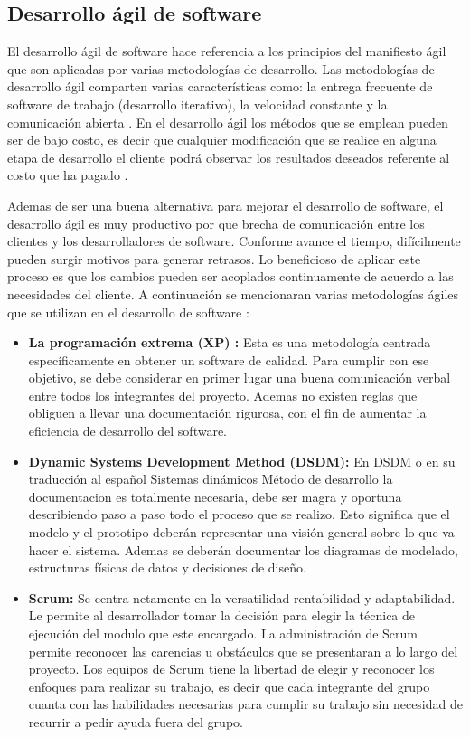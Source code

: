 \subsection{Desarrollo ágil de software}

El desarrollo ágil de software hace referencia a los principios del manifiesto ágil que son aplicadas por varias metodologías de desarrollo. Las metodologías de desarrollo ágil comparten varias características como: la entrega frecuente de software de trabajo (desarrollo iterativo), la velocidad constante y la comunicación abierta \cite{Whiting2022}. En el desarrollo ágil los métodos que se emplean pueden ser de bajo costo, es decir que cualquier modificación que se realice en alguna etapa de desarrollo el cliente podrá observar los resultados deseados referente al costo que ha pagado \cite{Shafiq2018}. 

Ademas de ser una buena alternativa para mejorar el desarrollo de software, el desarrollo ágil es muy productivo por que brecha de comunicación entre los clientes y los desarrolladores de software. Conforme avance el tiempo, difícilmente pueden surgir motivos para generar retrasos. Lo beneficioso de aplicar este proceso es que los cambios pueden ser acoplados continuamente de acuerdo a las necesidades del cliente. A continuación se mencionaran varias metodologías ágiles que se utilizan en el desarrollo de software \cite{Shafiq2018}:

\begin{itemize}
	\item \textbf{La programación extrema (XP) :} Esta es una metodología centrada específicamente en obtener un software de calidad. Para cumplir con ese objetivo, se debe considerar en primer lugar una buena comunicación verbal entre todos los integrantes del proyecto. Ademas no existen reglas que obliguen a llevar una documentación rigurosa, con el fin de aumentar la eficiencia de desarrollo del software.
	
	\item \textbf{Dynamic Systems Development Method (DSDM): }En DSDM o en su traducción al español Sistemas dinámicos Método de desarrollo la documentacion es totalmente necesaria, debe ser magra y oportuna describiendo paso a paso todo el proceso que se realizo. Esto significa que el modelo y el prototipo deberán representar una visión general sobre lo que va hacer el sistema. Ademas se deberán documentar los diagramas de modelado, estructuras físicas de datos y decisiones de diseño.
	
	\item \textbf{Scrum: } Se centra netamente en la versatilidad rentabilidad y adaptabilidad. Le permite al desarrollador tomar la decisión para elegir la técnica de ejecución del modulo que este encargado. La administración de Scrum permite reconocer las carencias u obstáculos que se presentaran a lo largo del proyecto. Los equipos de Scrum tiene la libertad de elegir y reconocer los enfoques para realizar su trabajo, es decir que cada integrante del grupo cuanta con las habilidades necesarias para cumplir su trabajo sin necesidad de recurrir a pedir ayuda fuera del grupo.
\end{itemize}

